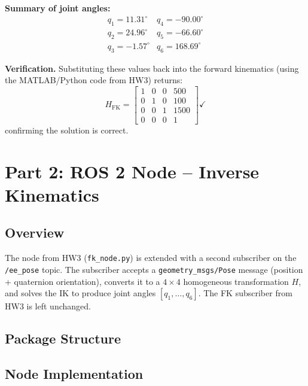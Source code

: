 \documentclass[12pt]{article}
\begin{document}
\textbf{Summary of joint angles:}
\[
\begin{array}{ll}
q_1 = 11.31^\circ  & q_4 = -90.00^\circ \\
q_2 = 24.96^\circ  & q_5 = -66.60^\circ \\
q_3 = -1.57^\circ  & q_6 = 168.69^\circ
\end{array}
\]

\textbf{Verification.}
Substituting these values back into the forward kinematics
(using the MATLAB/Python code from HW3) returns:
\[
H_{\text{FK}} = \begin{bmatrix}
1 & 0 & 0 & 500 \\
0 & 1 & 0 & 100 \\
0 & 0 & 1 & 1500 \\
0 & 0 & 0 & 1
\end{bmatrix} \checkmark
\]
confirming the solution is correct.

\newpage
\section{Part 2: ROS 2 Node -- Inverse Kinematics}

\subsection{Overview}

The node from HW3 (\texttt{fk\_node.py}) is extended with a second
subscriber on the \texttt{/ee\_pose} topic.  The subscriber accepts
a \texttt{geometry\_msgs/Pose} message (position + quaternion
orientation), converts it to a $4\times4$ homogeneous transformation
$H$, and solves the IK to produce joint angles $[q_1,\ldots,q_6]$.
The FK subscriber from HW3 is left unchanged.

\subsection{Package Structure}


\subsection{Node Implementation}
\end{document}
